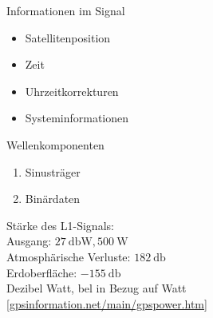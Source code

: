 \begin{multicols}{2}
    Informationen im Signal
    \begin{itemize}
        \item Satellitenposition
        \item Zeit
        \item Uhrzeitkorrekturen
        \item Systeminformationen
    \end{itemize}
    \columnbreak
    Wellenkomponenten
    \begin{enumerate}
        \item Sinusträger
        \item Binärdaten
    \end{enumerate}
\end{multicols}
Stärke des L1-Signals:\\
Ausgang: $\SI{27}{\decibel\watt}, \SI{500}{\watt}$\\
Atmosphärische Verluste: $\SI{182}{\decibel}$\\
Erdoberfläche: $\SI{-155}{\decibel}$\\
Dezibel Watt, bel in Bezug auf Watt\\
{\small [\url{gpsinformation.net/main/gpspower.htm}]}
